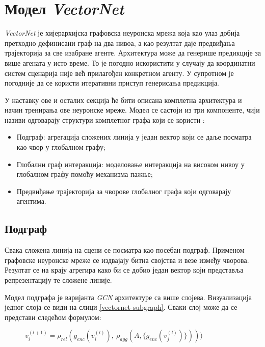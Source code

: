 \documentclass[11pt,oneside]{memoir}
\begin{document}
\section{Модел \textit{VectorNet}}

\textit{VectorNet} је хијерархијска графовска неуронска мрежа која као улаз добија претходно дефинисани граф на два нивоа, а као резултат
даје предвиђања трајекторија за све изабране агенте. Архитектура може да генерише предикције за више агената у исто време. То
је погодно искористити у случају да координатни систем сценарија није већ прилагођен конкретном агенту. У супротном је погодније
да се користи итеративни приступ генерисања предикција.

У наставку ове и осталих секција ће бити описана комплетна архитектура и начин тренирања ове неуронске мреже. Модел се састоји из три компоненте,
чији називи одговарају структури комплетног графа који се користи \cite{vectornet}:
\begin{itemize}
  \item Подграф: агрегација сложених линија у један вектор који се даље посматра као чвор у глобалном графу;
  \item Глобални граф интеракција: моделовање интеракција на високом нивоу у глобалном графу помоћу механизма пажње;
  \item Предвиђање трајекторија за чворове глобалног графа који одговарају агентима.
\end{itemize}

\subsection{Подграф}

Свака сложена линија на сцени се посматра као посебан подграф. Применом графовске неуронске мреже
се издвајају битна својства и везе између чворова. Резултат се на крају агрегира како би се добио један вектор који представља репрезентацију те сложене линије.

Модел подграфа је варијанта \textit{GCN} архитектуре \cite{gcn} са више слојева. Визуализација једног слоја се види на слици \ref{vectornet-subgraph}. 
Сваки слој може да се представи следећом формулом:

\begin{figure}[H]
  \centering
  $v^{(l+1)}_{i} = \rho_{rel}(g_{enc}(v^{(l)}_{i}),\ \rho_{agg}(A, \{g_{enc}(v^{(l)}_{j})\})))$
\end{figure}
\end{document}
